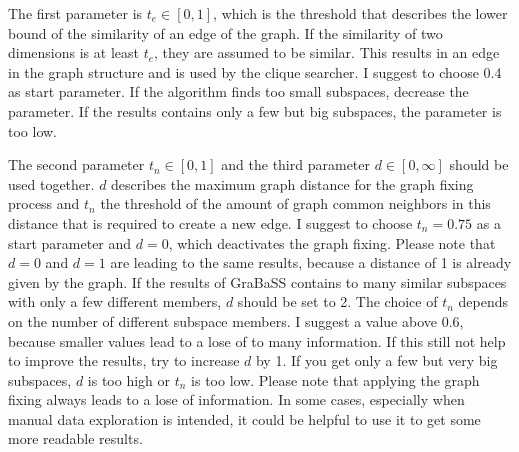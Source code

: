 The first parameter is $t_e \in [0,1]$, which is the threshold that describes the lower bound of the similarity of an edge of the graph. If the similarity of two dimensions is at least $t_e$, they are assumed to be similar. This results in an edge in the graph structure and is used by the clique searcher. I suggest to choose \num{0.4} as start parameter. If the algorithm finds too small subspaces, decrease the parameter. If the results contains only a few but big subspaces, the parameter is too low.

The second parameter $t_n \in [0,1]$ and the third parameter $d \in [0,\infty]$ should be used together. $d$ describes the maximum graph distance for the graph fixing process and $t_n$ the threshold of the amount of graph common neighbors in this distance that is required to create a new edge. I suggest to choose $t_n = 0.75$ as a start parameter and $d = 0$, which deactivates the graph fixing. Please note that $d=0$ and $d=1$ are leading to the same results, because a distance of \num{1} is already given by the graph. If the results of GraBaSS contains to many similar subspaces with only a few different members, $d$ should be set to \num{2}. The choice of $t_n$ depends on the number of different subspace members. I suggest a value above \num{0.6}, because smaller values lead to a lose of to many information. If this still not help to improve the results, try to increase $d$ by \num{1}. If you get only a few but very big subspaces, $d$ is too high or $t_n$ is too low. Please note that applying the graph fixing always leads to a lose of information. In some cases, especially when manual data exploration is intended, it could be helpful to use it to get some more readable results.
